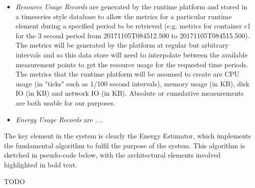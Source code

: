 \begin{itemize}
\item \emph{Resource Usage Records} are generated by the runtime platform and stored in a timeseries style database to allow the metrics for a particular runtime element during a specified period to be retrieved (e.g. metrics for container c1 for the 3 second period from 20171105T084512.500 to 20171105T084515.500).  The metrics will be generated by the platform at regular but arbitrary intervals and so this data store will need to interpolate between the available measurement points to get the resource usage for the requested time periods.  The metrics that the runtime platform will be assumed to create are CPU usage (in "ticks" such as 1/100 second intervals), memory usage (in KB), disk IO (in KB) and network IO (in KB).  Absolute or cumulative measurements are both usable for our purposes.

\item \emph{Energy Usage Records} are ....

\end{itemize}

The key element in the system is clearly the Energy Estimator, which implements the fundamental algorithm to fulfil the purpose of the system.  This algorithm is sketched in pseudo-code below, with the architectural elements involved highlighted in bold text.

TODO











